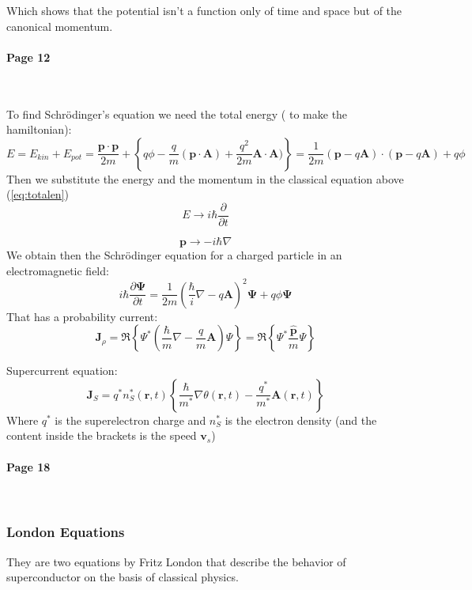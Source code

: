 \documentclass[12pt]{article}
\numberwithin{equation}{subsection}
\newcommand\page[1]{
{
\color{blue}\paragraph{
Page #1
}\mbox{}\\
}
}
\begin{document}
Which shows that the potential isn't a function only of time and space but of the canonical momentum.

\page{12}
To find Schrödinger's equation we need the total energy ( to make the hamiltonian):
\begin{equation}
    E= E_{kin}+ E_{pot}  = \frac{\mathbf p \cdot \mathbf p}{2m}+\left\{ q\phi- \frac{q}{m} (\mathbf{p} \cdot \mathbf{A}) + \frac{q^2}{2m} \mathbf A \cdot \mathbf A)\right\} = \frac{1}{2m} (\mathbf{p} -q \mathbf{A})\cdot(\mathbf{p} -q \mathbf{A})+q\phi
    \label{eq:totalen}
\end{equation}
Then we substitute the energy and the momentum in the classical equation above (\ref{eq:totalen})
\begin{equation}
    E \rightarrow i\hbar \frac{\partial}{\partial t}
\end{equation}
    
\begin{equation}
    \mathbf{p}\rightarrow -i\hbar \nabla
\end{equation}
We obtain then the Schrödinger equation for a charged particle in an electromagnetic field:
\begin{equation}
    i\hbar \frac{\partial\mathbf \Psi}{\partial t}= \frac{1}{2m}\left( \frac{\hbar}{i}\nabla -q\mathbf A \right)^2 \mathbf \Psi + q \phi  \mathbf \Psi 
\end{equation}
That has a probability current:
\begin{equation}
    \mathbf J_\rho =\mathfrak R \left \{ \Psi^* \left(\frac{\hbar}{m}\nabla-\frac{q}{m} \mathbf A\right)\Psi      \right\} = \mathfrak R \left \{ \Psi^* \frac{\hat{ \mathbf p}}{m} \Psi      \right\}
\end{equation}

Supercurrent equation:
\begin{equation}
    \mathbf J_S = q^* n_S^*(\mathbf r,t) \left \{ \frac{\hbar}{m^*} \nabla\theta(\mathbf r, t) -\frac{q^*}{m^*} \mathbf A (\mathbf r, t)  \right \}
    \label{eq:supcur}
\end{equation}
Where $q^*$ is the superelectron charge and $n^*_S $ is the electron density (and the content inside the brackets is the speed $\mathbf v_s$)
\page{18}
\subsubsection{London Equations}
They are two equations by Fritz London that describe the behavior of superconductor on the basis of classical physics.
\end{document}
